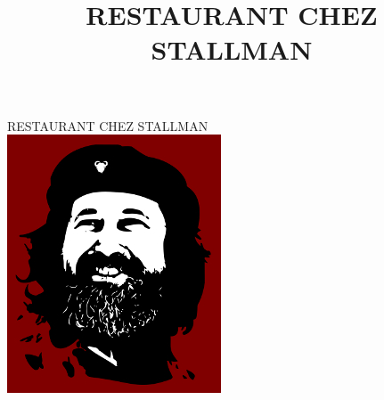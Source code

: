 \documentclass[a4paper,oneside]{article}
\title{RESTAURANT CHEZ STALLMAN}
\date{}
\begin{document}
\begin{center}
RESTAURANT CHEZ STALLMAN \\
\bigskip
\includegraphics[scale=0.5]{logo_restaurant.jpg}
\end{center}
\small
{} 
\end{document}
